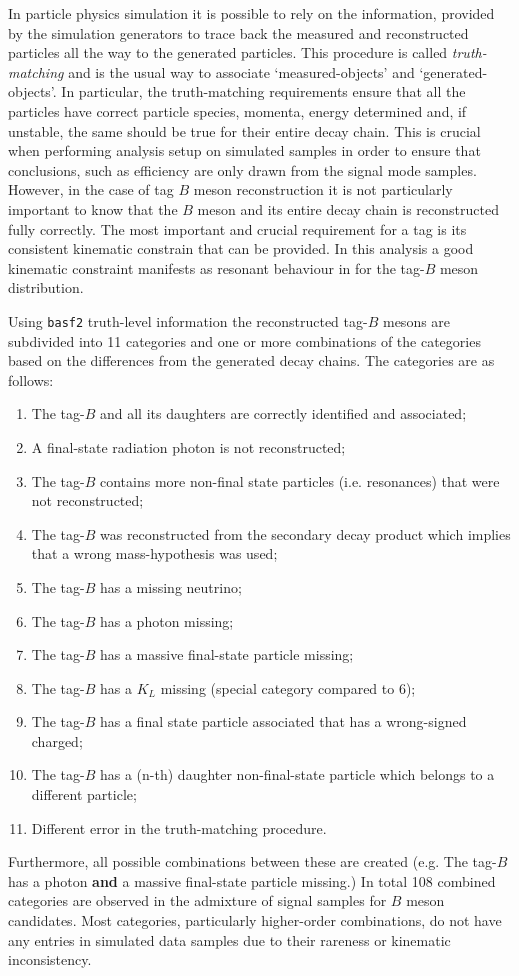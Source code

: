 In particle physics simulation it is possible to rely on the information, provided by the simulation generators to trace back the measured and reconstructed particles all the way to the generated particles.
This procedure is called \textit{truth-matching} and is the usual way to associate `measured-objects' and `generated-objects'.
In particular, the truth-matching requirements ensure that all the particles have correct particle species, momenta, energy determined and, if unstable, the same should be true for their entire decay chain.
This is crucial when performing analysis setup on simulated samples in order to ensure that conclusions, such as efficiency are only drawn from the signal mode samples.
However, in the case of tag $B$ meson reconstruction it is not particularly important to know that the $B$ meson and its entire decay chain is reconstructed fully correctly.
The most important and crucial requirement for a tag is its consistent kinematic constrain that can be provided.
In this analysis a good kinematic constraint manifests as resonant behaviour in \Mbc for the tag-$B$ meson distribution.

Using \texttt{basf2} truth-level information the reconstructed tag-$B$ mesons are subdivided into 11 categories and one or more combinations of the categories based on the differences from the generated decay chains.
The categories are as follows:
\begin{enumerate}
    \setcounter{enumi}{0}
    \item The tag-$B$ and all its daughters are correctly identified and associated;
    \item A final-state radiation photon is not reconstructed;
    \item The tag-$B$ contains more non-final state particles (i.e. resonances) that were not reconstructed;
    \item The tag-$B$ was reconstructed from the secondary decay product which implies that a wrong mass-hypothesis was used;
    \item The tag-$B$ has a missing neutrino;
    \item The tag-$B$ has a photon missing;
    \item The tag-$B$ has a massive final-state particle missing;
    \item The tag-$B$ has a $K_L$ missing (special category compared to 6);
    \item The tag-$B$ has a final state particle associated that has a wrong-signed charged;
    \item The tag-$B$ has a (n-th) daughter non-final-state particle which belongs to a different particle;
    \item Different error in the truth-matching procedure.
\end{enumerate}
Furthermore, all possible combinations between these are created (e.g. The tag-$B$ has a photon \textbf{and} a massive final-state particle missing.)
In total 108 combined categories are observed in the admixture of \BtoXsgamma signal \MC samples for $B$ meson candidates.
Most categories, particularly higher-order combinations, do not have any entries in simulated data samples due to their rareness or kinematic inconsistency.

